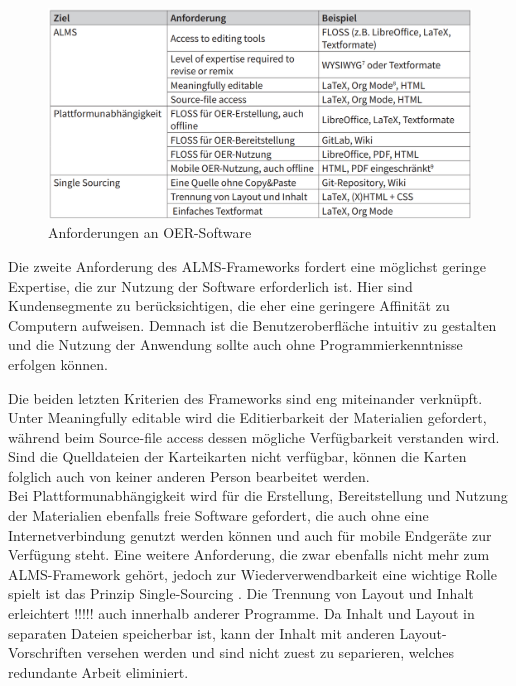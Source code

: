 \begin{figure}[h]
\begin{center}
\includegraphics[width = 16cm]{alms_framework.png}
\caption{Anforderungen an OER-Software \cite{Lechtenborger.2019}}
\label{Anforderungen an OER-Software}

\end{center}
\end{figure}


Die zweite Anforderung des ALMS-Frameworks fordert eine möglichst geringe Expertise, die zur Nutzung der Software erforderlich ist. Hier sind Kundensegmente zu berücksichtigen, die eher eine geringere Affinität zu Computern aufweisen. Demnach ist die Benutzeroberfläche intuitiv zu gestalten und die Nutzung der Anwendung sollte auch ohne Programmierkenntnisse erfolgen können.

Die beiden letzten Kriterien des Frameworks sind eng miteinander verknüpft. Unter \glqq Meaningfully editable \grqq{} wird die Editierbarkeit der Materialien gefordert, während beim \glqq Source-file access \grqq{} dessen mögliche Verfügbarkeit verstanden wird. Sind die Quelldateien der Karteikarten nicht verfügbar, können die Karten folglich auch von keiner anderen Person bearbeitet werden. \\

Bei Plattformunabhängigkeit wird für die Erstellung, Bereitstellung und Nutzung der Materialien ebenfalls freie Software gefordert, die auch ohne eine Internetverbindung genutzt werden können und auch für mobile Endgeräte zur Verfügung steht. Eine weitere Anforderung, die zwar ebenfalls nicht mehr zum ALMS-Framework gehört, jedoch zur Wiederverwendbarkeit eine wichtige Rolle spielt ist das Prinzip \glqq Single-Sourcing \grqq{}. Die Trennung von Layout und Inhalt erleichtert !!!!! auch innerhalb anderer Programme. Da Inhalt und Layout in separaten Dateien speicherbar ist, kann der Inhalt mit anderen Layout-Vorschriften versehen werden und sind nicht zuest zu separieren, welches redundante Arbeit eliminiert.  \\

